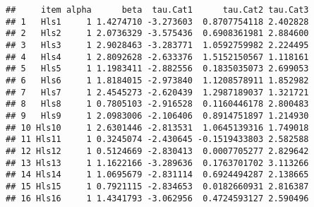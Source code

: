 \documentclass[
]{book}
\newenvironment{Shaded}{\begin{snugshade}}{\end{snugshade}}
\newcommand{\CommentTok}[1]{\textcolor[rgb]{0.56,0.35,0.01}{\textit{#1}}}
\newcommand{\NormalTok}[1]{#1}
\newcommand{\SpecialCharTok}[1]{\textcolor[rgb]{0.00,0.00,0.00}{#1}}
\begin{document}
\begin{verbatim}
##     item alpha      beta  tau.Cat1      tau.Cat2 tau.Cat3
## 1   Hls1     1 1.4274710 -3.273603  0.8707754118 2.402828
## 2   Hls2     1 2.0736329 -3.575436  0.6908361981 2.884600
## 3   Hls3     1 2.9028463 -3.283771  1.0592759982 2.224495
## 4   Hls4     1 2.8092628 -2.633376  1.5152150567 1.118161
## 5   Hls5     1 1.1983411 -2.882556  0.1835035073 2.699053
## 6   Hls6     1 1.8184015 -2.973840  1.1208578911 1.852982
## 7   Hls7     1 2.4545273 -2.620439  1.2987189037 1.321721
## 8   Hls8     1 0.7805103 -2.916528  0.1160446178 2.800483
## 9   Hls9     1 2.0983006 -2.106406  0.8914751897 1.214930
## 10 Hls10     1 2.6301446 -2.813531  1.0645139316 1.749018
## 11 Hls11     1 0.3245074 -2.430645 -0.1519433803 2.582588
## 12 Hls12     1 0.5124669 -2.830413  0.0007705277 2.829642
## 13 Hls13     1 1.1622166 -3.289636  0.1763701702 3.113266
## 14 Hls14     1 1.0695679 -2.831114  0.6924494287 2.138665
## 15 Hls15     1 0.7921115 -2.834653  0.0182660931 2.816387
## 16 Hls16     1 1.4341793 -3.062956  0.4724593127 2.590496
\end{verbatim}

\begin{Shaded}
\end{Shaded}
\end{document}
